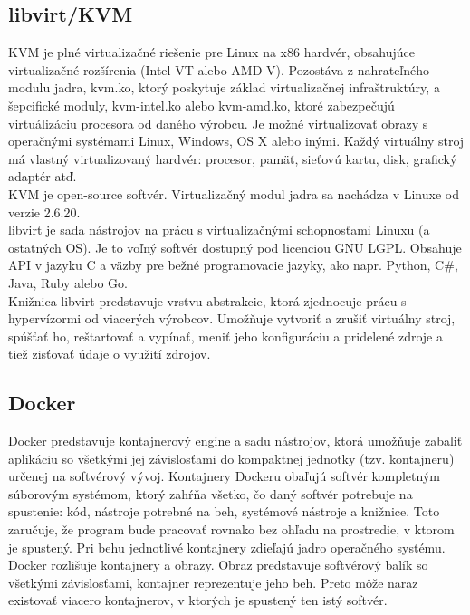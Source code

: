 \documentclass[printed,11pt,twoside,color,cover,table]{fithesis3}
\begin{document}
\subsection{libvirt/KVM}
\label{sec:kvm}
KVM je plné virtualizačné riešenie pre Linux na x86 hardvér, obsahujúce virtualizačné rozšírenia (Intel VT alebo AMD-V).
Pozostáva z nahrateľného modulu jadra, kvm.ko, ktorý poskytuje základ virtualizačnej infraštruktúry, a šepcifické moduly, kvm-intel.ko alebo kvm-amd.ko, ktoré zabezpečujú virtuálizáciu procesora od daného 
výrobcu.
Je možné virtualizovať obrazy s operačnými systémami Linux, Windows, OS X alebo inými. Každý virtuálny stroj má vlastný virtualizovaný hardvér: procesor, pamäť, sieťovú kartu, disk, grafický adaptér atď. 
\\KVM je open-source softvér. Virtualizačný modul jadra sa nachádza v Linuxe od verzie 2.6.20.\cite{kvm}
\\libvirt je sada nástrojov na prácu s virtualizačnými schopnosťami Linuxu (a ostatných OS). Je to voľný softvér dostupný pod licenciou GNU LGPL. 
Obsahuje API v jazyku C a väzby pre bežné programovacie jazyky, ako napr. Python, C\#, Java, Ruby alebo Go.\cite{libvirt}
\\Knižnica libvirt predstavuje vrstvu abstrakcie, ktorá zjednocuje prácu s hypervízormi od viacerých výrobcov. Umožňuje vytvoriť a zrušiť virtuálny stroj, spúšťať ho, reštartovať a vypínať, 
meniť jeho konfiguráciu a pridelené zdroje a tiež zisťovať údaje o využití zdrojov.

\subsection{Docker}
Docker predstavuje kontajnerový engine a sadu nástrojov, ktorá umožňuje zabaliť aplikáciu so všetkými jej závislosťami do kompaktnej jednotky (tzv. kontajneru) určenej na softvérový vývoj. Kontajnery Dockeru 
obaľujú softvér kompletným súborovým systémom, ktorý zahŕňa všetko, čo daný softvér potrebuje na spustenie: kód, nástroje potrebné na beh, systémové nástroje a knižnice. Toto zaručuje, že program bude 
pracovať rovnako bez ohľadu na prostredie, v ktorom je spustený.\cite{docker} Pri behu jednotlivé kontajnery zdieľajú jadro operačného systému.
\\Docker rozlišuje kontajnery a obrazy. Obraz predstavuje softvérový balík so všetkými závislosťami, kontajner reprezentuje jeho beh. Preto môže naraz existovať viacero kontajnerov, v ktorých je spustený ten istý
softvér.
\end{document}
